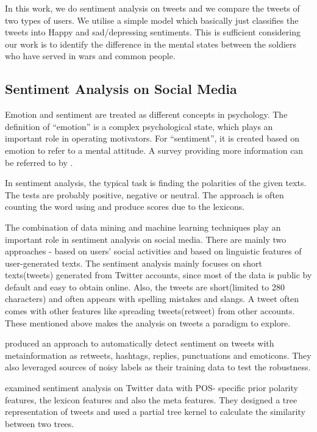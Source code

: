 In this work, we do sentiment analysis on tweets and we compare the tweets of
two types of users. We utilise a simple model which basically just classifies
the tweets into Happy and sad/depressing sentiments. This is sufficient
considering our work is to identify the difference in the mental states between
the soldiers who have served in wars and common people.

\subsection{Sentiment Analysis on Social Media}

Emotion and sentiment are treated as different concepts in psychology. The
definition of \enquote{emotion} is a complex psychological state, which plays an
important role in operating motivators. For \enquote{sentiment}, it is created based on
emotion to refer to a mental attitude. A survey providing more information can
be referred to by \cite{yue2018survey}.

In sentiment analysis, the typical task is finding the polarities of the given
texts. The tests are probably positive, negative or neutral. The approach is
often counting the word using and produce scores due to the lexicons.

The combination of data mining and machine learning techniques play an important
role in sentiment analysis on social media. There are mainly two approaches -
based on users' social activities and based on linguistic features of
user-generated texts. The sentiment analysis mainly focuses on short texts(tweets)
generated from Twitter accounts, since most of the data is public by default and
easy to obtain online. Also, the tweets are short(limited to 280 characters) and
often appears with spelling mistakes and slangs. A tweet often comes with other
features like spreading tweets(retweet) from other accounts. These mentioned
above makes the analysis on tweets a paradigm to explore.

\cite{robustTwitter2010Luciano} produced an approach to automatically detect
sentiment on tweets with metainformation as retweets, hashtags, replies,
punctuations and emoticons. They also leveraged sources of noisy
labels as their training data to test the robustness.

\cite{agarwal2011sentiment} examined sentiment analysis on Twitter data with POS-
specific prior polarity features, the lexicon features and also the meta
features. They designed a tree representation of tweets and used a partial tree
kernel to calculate the similarity between two trees.

